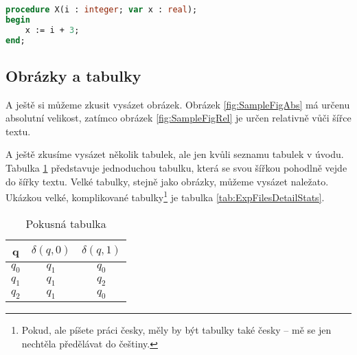\documentclass[bc,male,java,dept460]{diploma}		%
\begin{document}


\begin{lstlisting}[language=Pascal,label=src:Pascal,caption=Program v Pascalu]
procedure X(i : integer; var x : real);
begin
	x := i + 3;
end;
\end{lstlisting}

\subsection{Obrázky a tabulky}
A ještě si můžeme zkusit vysázet obrázek. Obrázek \ref{fig:SampleFigAbs} má určenu absolutní velikost,
zatímco obrázek \ref{fig:SampleFigRel} je určen relativně vůči šířce textu.




A ještě zkusíme vysázet několik tabulek, ale jen kvůli seznamu tabulek v úvodu. Tabulka \ref{tab:ExpTable} představuje jednoduchou tabulku, která se svou šířkou pohodlně vejde do šířky textu. Velké tabulky, stejně jako obrázky, můžeme vysázet naležato. Ukázkou velké, komplikované tabulky\footnote{Pokud, ale píšete práci česky, měly by být tabulky také česky -- mě se jen nechtěla předělávat do češtiny.} je tabulka \ref{tab:ExpFilesDetailStats}.
 
\begin{table}
  \centering
  \begin{tabular}{|c|c|c|}
    \hline
    q & $\delta(q, 0)$ & $\delta(q, 1)$ \\
    \hline
    $q_0$ & $q_1$ & $q_0$ \\
    \hline
    $q_1$ & $q_1$ & $q_2$ \\
    \hline
    $q_2$ & $q_1$ & $q_0$ \\
    \hline
  \end{tabular}
  \caption{Pokusná tabulka}
  \label{tab:ExpTable}
\end{table}
\end{document}
